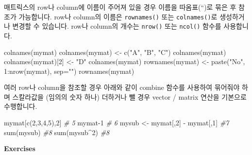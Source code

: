 \documentclass[
]{book}
\newenvironment{Shaded}{\begin{snugshade}}{\end{snugshade}}
\newcommand{\AttributeTok}[1]{\textcolor[rgb]{0.77,0.63,0.00}{#1}}
\newcommand{\CommentTok}[1]{\textcolor[rgb]{0.56,0.35,0.01}{\textit{#1}}}
\newcommand{\DecValTok}[1]{\textcolor[rgb]{0.00,0.00,0.81}{#1}}
\newcommand{\FunctionTok}[1]{\textcolor[rgb]{0.00,0.00,0.00}{#1}}
\newcommand{\NormalTok}[1]{#1}
\newcommand{\OtherTok}[1]{\textcolor[rgb]{0.56,0.35,0.01}{#1}}
\newcommand{\SpecialCharTok}[1]{\textcolor[rgb]{0.00,0.00,0.00}{#1}}
\newcommand{\StringTok}[1]{\textcolor[rgb]{0.31,0.60,0.02}{#1}}
\begin{document}
매트릭스의 row나 column에 이름이 주어져 있을 경우 이름을 따옴표(``)로 묶은 후 참조가 가능합니다. row나 column의 이름은 \texttt{rownames()} 또는 \texttt{colnames()}로 생성하거나 변경할 수 있습니다. row나 column의 개수는 \texttt{nrow()} 또는 \texttt{ncol()} 함수를 사용합니다.

\begin{Shaded}
\begin{Highlighting}[]
\FunctionTok{colnames}\NormalTok{(mymat)}
\FunctionTok{colnames}\NormalTok{(mymat) }\OtherTok{\textless{}{-}} \FunctionTok{c}\NormalTok{(}\StringTok{"A"}\NormalTok{, }\StringTok{"B"}\NormalTok{, }\StringTok{"C"}\NormalTok{)}
\FunctionTok{colnames}\NormalTok{(mymat)}
\FunctionTok{colnames}\NormalTok{(mymat)[}\DecValTok{2}\NormalTok{] }\OtherTok{\textless{}{-}} \StringTok{"D"}
\FunctionTok{colnames}\NormalTok{(mymat)}
\FunctionTok{rownames}\NormalTok{(mymat) }\OtherTok{\textless{}{-}} \FunctionTok{paste}\NormalTok{(}\StringTok{"No"}\NormalTok{, }\DecValTok{1}\SpecialCharTok{:}\FunctionTok{nrow}\NormalTok{(mymat), }\AttributeTok{sep=}\StringTok{""}\NormalTok{)}
\FunctionTok{rownames}\NormalTok{(mymat)}
\end{Highlighting}
\end{Shaded}

여러 row나 column을 참조할 경우 아래와 같이 combine 함수를 사용하여 묶어줘야 하며 스칼라값을 (임의의 숫자 하나) 더하거나 뺄 경우 vector / matrix 연산을 기본으로 수행합니다.

\begin{Shaded}
\begin{Highlighting}[]
\NormalTok{mymat[}\FunctionTok{c}\NormalTok{(}\DecValTok{2}\NormalTok{,}\DecValTok{3}\NormalTok{,}\DecValTok{4}\NormalTok{,}\DecValTok{5}\NormalTok{),}\DecValTok{2}\NormalTok{] }\CommentTok{\# 5}
\NormalTok{mymat}\DecValTok{{-}1} \CommentTok{\# 6}
\NormalTok{mysub }\OtherTok{\textless{}{-}}\NormalTok{ mymat[,}\DecValTok{2}\NormalTok{] }\SpecialCharTok{{-}}\NormalTok{ mymat[,}\DecValTok{1}\NormalTok{] }\CommentTok{\#7}
\FunctionTok{sum}\NormalTok{(mysub) }\CommentTok{\#8}
\FunctionTok{sum}\NormalTok{(mysub}\SpecialCharTok{\^{}}\DecValTok{2}\NormalTok{) }\CommentTok{\#8}
\end{Highlighting}
\end{Shaded}

\textbf{Exercises}
\end{document}
